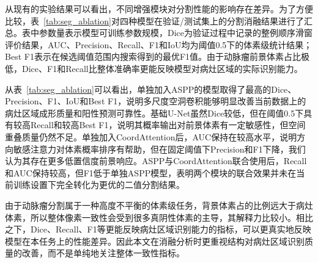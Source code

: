 从现有的实验结果可以看出，不同增强模块对分割性能的影响存在差异。为了方便比较，表~\ref{tab:seg_ablation}对四种模型在验证/测试集上的分割消融结果进行了汇总。表中参数量表示模型可训练参数规模，Dice为验证过程中记录的整例顺序滑窗评价结果，AUC、Precision、Recall、F1和IoU均为阈值0.5下的体素级统计结果；Best F1表示在候选阈值范围内搜索得到的最优F1值。由于动脉瘤前景体素占比极低，Dice、F1和Recall比整体准确率更能反映模型对病灶区域的实际识别能力。

\begin{table}[!htbp]
\centering
\caption{分割模型消融结果比较}
\label{tab:seg_ablation}
\small
\renewcommand{\arraystretch}{0.88}
\setlength{\tabcolsep}{3pt}
\normalsize
\renewcommand{\arraystretch}{1}
\end{table}

从表~\ref{tab:seg_ablation}可以看出，单独加入ASPP的模型取得了最高的Dice、Precision、F1、IoU和Best F1，说明多尺度空洞卷积能够明显改善当前数据上的病灶区域成形质量和阳性预测可靠性。基础U-Net虽然Dice较低，但在阈值0.5下具有较高Recall和较高Best F1，说明其概率输出对前景体素有一定敏感性，但空间重叠质量仍然不足。单独加入CoordAttention后，AUC保持在较高水平，说明方向敏感注意力对体素概率排序有帮助，但在固定阈值下Precision和F1下降，我们认为其存在更多低置信度前景响应。ASPP与CoordAttention联合使用后，Recall和AUC保持较高，但F1低于单独ASPP模型，表明两个模块的联合效果并未在当前训练设置下完全转化为更优的二值分割结果。

由于动脉瘤分割属于一种高度不平衡的体素级任务，背景体素占的比例远大于病灶体素，所以整体像素一致性会受到很多真阴性体素的主导，其解释力比较小。相比之下，Dice、Recall、F1等更能反映病灶区域识别能力的指标，可以更真实地反映模型在本任务上的性能差异。因此本文在消融分析时更重视结构对病灶区域识别质量的改善，而不是单纯地关注整体一致性指标。

